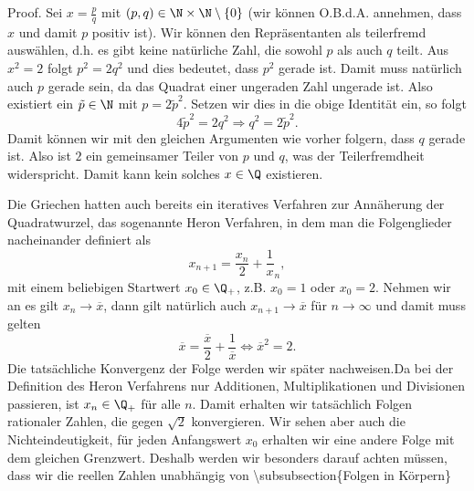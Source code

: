 \documentclass[letterpaper,10pt,english]{jupyterBook}
\begin{document}
\begin{emphBox}{}{}
Proof.  Sei \(x = \frac{p}q\) mit \((p,q) \in \N \times \N \setminus \{0\}\) (wir können O.B.d.A. annehmen, dass \(x\) und damit \(p\) positiv ist). Wir können den Repräsentanten als teilerfremd auswählen, d.h. es gibt keine natürliche Zahl, die sowohl \(p\) als auch \(q\) teilt. Aus \(x^2 =2\) folgt \(p^2 = 2 q^2\) und dies bedeutet, dass \(p^2\) gerade ist. Damit muss natürlich auch \(p\) gerade sein, da das Quadrat einer ungeraden Zahl ungerade ist. Also existiert ein \(\tilde p \in \N\) mit \(p = 2 \tilde p^2\). Setzen wir dies in die obige Identität ein, so folgt
\begin{equation*}
 4 \tilde p^2 = 2 q^2 \Rightarrow q^2 = 2 \tilde p^2.
\end{equation*}
Damit können wir mit den gleichen Argumenten wie vorher folgern, dass \(q\) gerade ist. Also ist \(2\) ein gemeinsamer Teiler von \(p\) und \(q\), was der Teilerfremdheit widerspricht. Damit kann kein solches \(x \in \Q\) existieren.

Die Griechen hatten auch bereits ein iteratives Verfahren zur Annäherung der Quadratwurzel, das sogenannte Heron Verfahren, in dem man die Folgenglieder nacheinander definiert als
\begin{equation*}
 x_{n+1}=\frac{x_n}2 + \frac{1}x_n,
\end{equation*}
mit einem beliebigen Startwert \(x_0 \in \Q_+\), z.B. \(x_0=1\) oder \(x_0=2\). Nehmen wir an es gilt \(x_n \rightarrow \overline{x}\), dann gilt natürlich auch \( x_{n+1} \rightarrow \overline{x}\) für \(n\rightarrow \infty\) und damit muss gelten
\begin{equation*}
 \overline{x}=\frac{\overline{x}}2 + \frac{1}{\overline{x}} \Leftrightarrow \overline{x}^2=2.
\end{equation*}
Die tatsächliche Konvergenz der Folge werden wir später nachweisen.Da bei der Definition des Heron Verfahrens nur Additionen, Multiplikationen und Divisionen passieren, ist \(x_n \in \Q_+\) für alle \(n\). Damit erhalten wir tatsächlich Folgen rationaler Zahlen, die gegen \(\sqrt{2}\) konvergieren. Wir sehen aber auch die Nichteindeutigkeit, für jeden Anfangswert \(x_0\) erhalten wir eine andere Folge mit dem gleichen Grenzwert. Deshalb werden wir besonders darauf achten müssen, dass wir die reellen Zahlen unabhängig von
\textbackslash{}subsubsection\{Folgen in Körpern\}
\label{grundlagen/zahlensysteme:definition-13}
\begin{definition}{}{}




\end{definition}
\end{emphBox}
\end{document}

